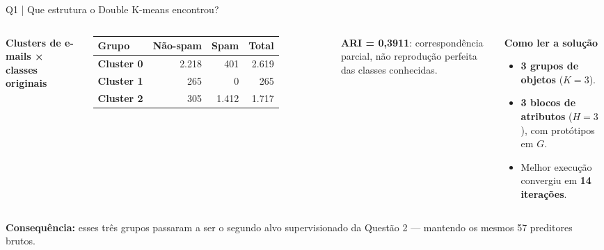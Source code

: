 \documentclass[aspectratio=169,11pt]{beamer}
\begin{document}
\begin{frame}[t]{Q1 | Que estrutura o Double K-means encontrou?}
\begin{columns}[T,onlytextwidth]
\small \textbf{Clusters de e-mails × classes originais}
\vspace{1.5mm}
\footnotesize
\renewcommand{\arraystretch}{1.45}
\begin{tabular}{lrrr}
\toprule
Grupo & Não-spam & Spam & Total\\
\midrule
\textbf{Cluster 0} & 2.218 & 401 & 2.619\\
\textbf{Cluster 1} & 265 & 0 & 265\\
\textbf{Cluster 2} & 305 & 1.412 & 1.717\\
\bottomrule
\end{tabular}
\vspace{2.5mm}
\begin{notabox}\small\textbf{ARI = 0,3911}: correspondência parcial, não reprodução perfeita das classes conhecidas.\end{notabox}
\begin{simplebox}
\textbf{Como ler a solução}\par\vspace{1mm}
\small
\begin{itemize}\setlength\itemsep{1.5mm}
\item \textbf{3 grupos de objetos} ($K=3$).
\item \textbf{3 blocos de atributos} ($H=3$), com protótipos em $G$.
\item Melhor execução convergiu em \textbf{14 iterações}.
\end{itemize}
\end{simplebox}
\end{columns}
\vspace{2mm}
\begin{alertabox}\small \textbf{Consequência:} esses três grupos passaram a ser o segundo alvo supervisionado da Questão 2 --- mantendo os mesmos 57 preditores brutos.\end{alertabox}
\end{frame}
\end{document}
